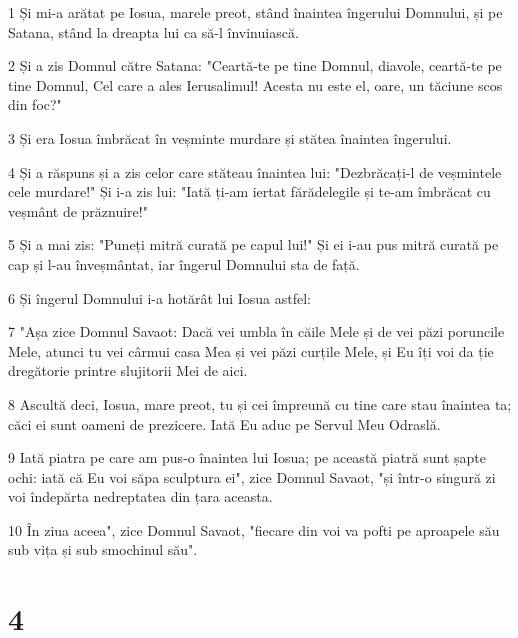 \par 1 Și mi-a arătat pe Iosua, marele preot, stând înaintea îngerului Domnului, și pe Satana, stând la dreapta lui ca să-l învinuiască.
\par 2 Și a zis Domnul către Satana: "Ceartă-te pe tine Domnul, diavole, ceartă-te pe tine Domnul, Cel care a ales Ierusalimul! Acesta nu este el, oare, un tăciune scos din foc?"
\par 3 Și era Iosua îmbrăcat în veșminte murdare și stătea înaintea îngerului.
\par 4 Și a răspuns și a zis celor care stăteau înaintea lui: "Dezbrăcați-l de veșmintele cele murdare!" Și i-a zis lui: "Iată ți-am iertat fărădelegile și te-am îmbrăcat cu veșmânt de prăznuire!"
\par 5 Și a mai zis: "Puneți mitră curată pe capul lui!" Și ei i-au pus mitră curată pe cap și l-au înveșmântat, iar îngerul Domnului sta de față.
\par 6 Și îngerul Domnului i-a hotărât lui Iosua astfel:
\par 7 "Așa zice Domnul Savaot: Dacă vei umbla în căile Mele și de vei păzi poruncile Mele, atunci tu vei cârmui casa Mea și vei păzi curțile Mele, și Eu îți voi da ție dregătorie printre slujitorii Mei de aici.
\par 8 Ascultă deci, Iosua, mare preot, tu și cei împreună cu tine care stau înaintea ta; căci ei sunt oameni de prezicere. Iată Eu aduc pe Servul Meu Odraslă.
\par 9 Iată piatra pe care am pus-o înaintea lui Iosua; pe această piatră sunt șapte ochi: iată că Eu voi săpa sculptura ei", zice Domnul Savaot, "și într-o singură zi voi îndepărta nedreptatea din țara aceasta.
\par 10 În ziua aceea", zice Domnul Savaot, "fiecare din voi va pofti pe aproapele său sub vița și sub smochinul său".

\chapter{4}

